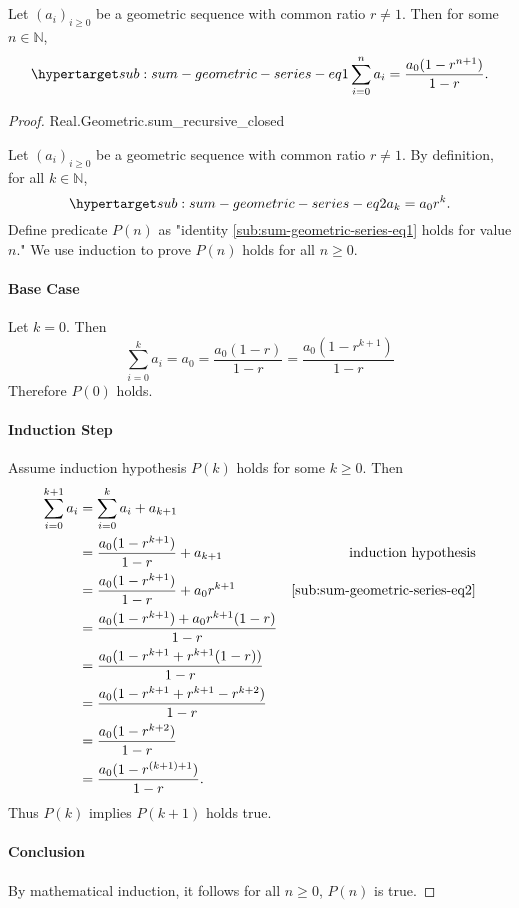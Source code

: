 \documentclass{article}
\begin{document}
\subsection{}%

Let $(a_i)_{i \geq 0}$ be a geometric sequence with common ratio $r \neq 1$.
  Then for some $n \in \mathbb{N}$,
  \begin{equation}
    \hyperlabel{sub:sum-geometric-series-eq1}
    \sum_{i=0}^n a_i = \frac{a_0(1 - r^{n+1})}{1 - r}.
  \end{equation}

\begin{proof}

    {Real.Geometric.sum\_recursive\_closed}

  Let $(a_i)_{i \geq 0}$ be a geometric sequence with common ratio $r \neq 1$.
  By definition, for all $k \in \mathbb{N}$,
    \begin{equation}
      \hyperlabel{sub:sum-geometric-series-eq2}
      a_k = a_0r^k.
    \end{equation}
  Define predicate $P(n)$ as "identity \eqref{sub:sum-geometric-series-eq1}
    holds for value $n$."
  We use induction to prove $P(n)$ holds for all $n \geq 0$.

  \paragraph{Base Case}%

    Let $k = 0$.
    Then $$\sum_{i=0}^k a_i = a_0 = \frac{a_0(1 - r)}{1 - r} =
      \frac{a_0(1 - r^{k+1})}{1 - r}$$
    Therefore $P(0)$ holds.

  \paragraph{Induction Step}%

    Assume induction hypothesis $P(k)$ holds for some $k \geq 0$.
    Then
      \begin{align*}
        \sum_{i=0}^{k+1} a_i
          & = \sum_{i=0}^k a_i + a_{k+1} \\
          & = \frac{a_0(1 - r^{k+1})}{1 - r} + a_{k + 1}
            & \text{induction hypothesis} \\
          & = \frac{a_0(1 - r^{k+1})}{1 - r} + a_0r^{k + 1}
            & \eqref{sub:sum-geometric-series-eq2} \\
          & = \frac{a_0(1 - r^{k+1}) + a_0r^{k+1}(1 - r)}{1 - r} \\
          & = \frac{a_0(1 - r^{k+1} + r^{k+1}(1 - r))}{1 - r} \\
          & = \frac{a_0(1 - r^{k+1} + r^{k+1} - r^{k+2})}{1 - r} \\
          & = \frac{a_0(1 - r^{k+2})}{1 - r} \\
          & = \frac{a_0(1 - r^{(k + 1) + 1})}{1 - r}.
      \end{align*}
    Thus $P(k)$ implies $P(k + 1)$ holds true.

  \paragraph{Conclusion}%

    By mathematical induction, it follows for all $n \geq 0$, $P(n)$ is true.

\end{proof}
\end{document}
